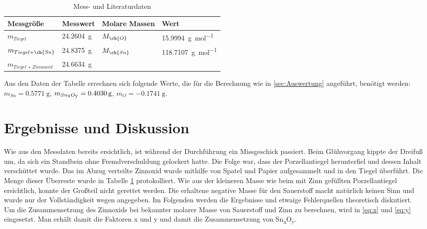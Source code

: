 \documentclass{article}
\begin{document}
      \begin{table}[H]
        \centering
        \caption[Mess- und Literaturdaten, Quelle: Autor]{Mess- und Literaturdaten}
        \label{tab:Messdaten}
          \begin{tabular}{@{}ll|ll@{}}
            \toprule
             Messgröße & Messwert & Molare Massen & Wert \\ \midrule
             $m_{Tiegel}$ & \SI[mode=text]{24.2604}{\gram} & $M_{\ch{O}}$ & \SI[mode=text]{15.9994}{\gram\per\mole} \\
             $m_{Tiegel+\ch{Sn}}$ & \SI[mode=text]{24.8375}{\gram} & $M_{\ch{Sn}}$ & \SI[mode=text]{118.7107}{\gram\per\mole} \\
             $m_{Tiegel+Zinnoxid}$ & \SI[mode=text]{24.6634}{\gram} &  &  \\ \bottomrule
          \end{tabular}
       \end{table}      
      
      Aus den Daten der Tabelle errechnen sich folgende Werte, die für die Berechnung wie in \ref{sec:Auswertung} angeführt, benötigt werden: $m_{Sn} = \SI[mode=text]{0.5771}{\gram}$, $m_{Sn\textsubscript{x}O\textsubscript{y}} = \SI[mode=text]{0.4030}{\gram}$, $m_{O} = \SI[mode=text]{-0.1741}{\gram}$.
      
  \section{Ergebnisse und Diskussion}
    
    Wie aus den Messdaten bereits ersichtlich, ist während der Durchführung ein Missgeschick passiert. Beim Glühvorgang kippte der Dreifuß um, da sich ein Standbein ohne Fremdverschuldung gelockert hatte. Die Folge war, dass der Porzellantiegel herunterfiel und dessen Inhalt verschüttet wurde. Das im Abzug verteilte Zinnoxid wurde mithilfe von Spatel und Papier aufgesammelt und in den Tiegel überführt. Die Menge dieser Überreste wurde in Tabelle \ref{tab:Messdaten} protokolliert. Wie aus der kleineren Masse wie beim mit Zinn gefüllten Porzellantiegel ersichtlich, konnte der Großteil nicht gerettet werden. Die erhaltene negative Masse für den Sauerstoff macht natürlich keinen Sinn und wurde nur der Vollständigkeit wegen angegeben. Im Folgenden werden die Ergebnisse und etwaige Fehlerquellen theoretisch diskutiert. \\
    
    Um die Zusammensetzung des Zinnoxids bei bekannter molarer Masse von Sauerstoff und Zinn zu berechnen, wird in \eqref{eq:x} und \eqref{eq:y} eingesetzt. Man erhält damit die Faktoren x und y und damit die Zusammensetzung von Sn\textsubscript{x}O\textsubscript{y}. 
    
\end{document}
